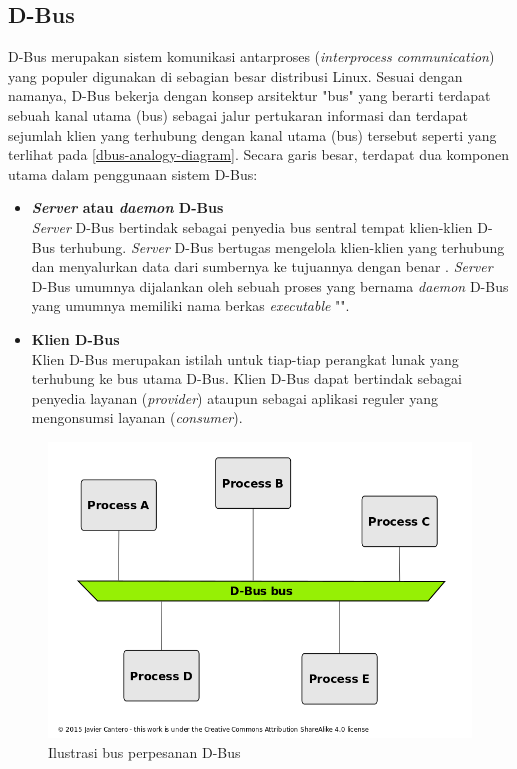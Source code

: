 \subsection{D-Bus}

D-Bus merupakan sistem komunikasi antarproses (\textit{interprocess communication}) yang populer digunakan di sebagian besar distribusi Linux. Sesuai dengan namanya, D-Bus bekerja dengan konsep arsitektur "bus" yang berarti terdapat sebuah kanal utama (bus) sebagai jalur pertukaran informasi dan terdapat sejumlah klien yang terhubung dengan kanal utama (bus) tersebut seperti yang terlihat pada \autoref{dbus-analogy-diagram}. Secara garis besar, terdapat dua komponen utama dalam penggunaan sistem D-Bus:

\begin{itemize}
    \item \textbf{\textit{Server} atau \textit{daemon} D-Bus}\\
    \textit{Server} D-Bus bertindak sebagai penyedia bus sentral tempat klien-klien D-Bus terhubung. \textit{Server} D-Bus bertugas mengelola klien-klien yang terhubung dan menyalurkan data dari sumbernya ke tujuannya dengan benar \cite{qt-introduction-to-dbus}. \textit{Server} D-Bus umumnya dijalankan oleh sebuah proses yang bernama \textit{daemon} D-Bus yang umumnya memiliki nama berkas \textit{executable} "".

    \item \textbf{Klien D-Bus}\\
    Klien D-Bus merupakan istilah untuk tiap-tiap perangkat lunak yang terhubung ke bus utama D-Bus. Klien D-Bus dapat bertindak sebagai penyedia layanan (\textit{provider}) ataupun sebagai aplikasi reguler yang mengonsumsi layanan (\textit{consumer}).
\end{itemize}

\begin{figure}
    \centering
    \includegraphics[width=0.75\linewidth]{assets/dbus-analogy-diagram.png}
    \caption{Ilustrasi bus perpesanan D-Bus \cite{dbus-bus-illustration}}
    \label{dbus-analogy-diagram}
\end{figure}

